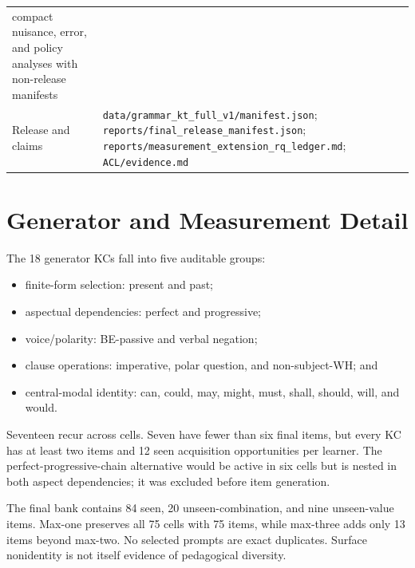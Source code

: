 \begin{center}
\begin{tabularx}{\columnwidth}{@{}p{} >{\raggedright\arraybackslash}X@{}}
      compact nuisance, error, and policy analyses with non-release manifests \\
    Release and claims &
      \nolinkurl{data/grammar_kt_full_v1/manifest.json};
      \nolinkurl{reports/final_release_manifest.json};
      \nolinkurl{reports/measurement_extension_rq_ledger.md};
      \nolinkurl{ACL/evidence.md} \\
    \bottomrule
  \end{tabularx}
  \captionsetup{hypcap=false}
  \label{tab:artifact-map}
\end{center}

\section{Generator and Measurement Detail}

The 18 generator KCs fall into five auditable groups:
\begin{itemize}
  \item finite-form selection: present and past;
  \item aspectual dependencies: perfect and progressive;
  \item voice/polarity: BE-passive and verbal negation;
  \item clause operations: imperative, polar question, and non-subject-WH; and
  \item central-modal identity: can, could, may, might, must, shall, should,
    will, and would.
\end{itemize}
Seventeen recur across cells.  Seven have fewer than six final items, but every
KC has at least two items and 12 seen acquisition opportunities per learner.
The perfect-progressive-chain alternative would be active in six cells but is
nested in both aspect dependencies; it was excluded before item generation.

The final bank contains 84 seen, 20 unseen-combination, and nine unseen-value
items.  Max-one preserves all 75 cells with 75 items, while max-three adds only
13 items beyond max-two.  No selected prompts are exact duplicates.  Surface
nonidentity is not itself evidence of pedagogical diversity.

